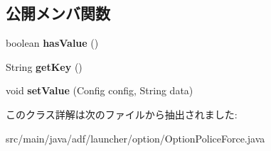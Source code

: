 \subsection*{公開メンバ関数}
\begin{DoxyCompactItemize}
\item 
\hypertarget{classadf_1_1launcher_1_1option_1_1OptionPoliceForce_a64c467ee39986e68e271cb869f22b705}{}\label{classadf_1_1launcher_1_1option_1_1OptionPoliceForce_a64c467ee39986e68e271cb869f22b705} 
boolean {\bfseries has\+Value} ()
\item 
\hypertarget{classadf_1_1launcher_1_1option_1_1OptionPoliceForce_a93ad800e1f33ea5d7b03050400fc18a5}{}\label{classadf_1_1launcher_1_1option_1_1OptionPoliceForce_a93ad800e1f33ea5d7b03050400fc18a5} 
String {\bfseries get\+Key} ()
\item 
\hypertarget{classadf_1_1launcher_1_1option_1_1OptionPoliceForce_a48a866b41794becf1ec4d4b52fab7306}{}\label{classadf_1_1launcher_1_1option_1_1OptionPoliceForce_a48a866b41794becf1ec4d4b52fab7306} 
void {\bfseries set\+Value} (Config config, String data)
\end{DoxyCompactItemize}


このクラス詳解は次のファイルから抽出されました\+:\begin{DoxyCompactItemize}
\item 
src/main/java/adf/launcher/option/Option\+Police\+Force.\+java\end{DoxyCompactItemize}
